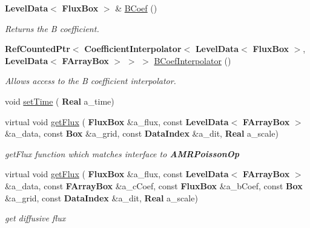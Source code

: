 \begin{DoxyCompactItemize}
\item 
\mbox{\label{class_darcy_brinkman_op_a9b2d72f39820a3dfcd502ea60232ddeb}} 
\textbf{ Level\+Data}$<$ \textbf{ Flux\+Box} $>$ \& \hyperlink{class_darcy_brinkman_op_a9b2d72f39820a3dfcd502ea60232ddeb}{B\+Coef} ()
\begin{DoxyCompactList}\small\item\em Returns the B coefficient. \end{DoxyCompactList}\item 
\mbox{\label{class_darcy_brinkman_op_a16cce095d955f2514589e45bd6b348df}} 
\textbf{ Ref\+Counted\+Ptr}$<$ \textbf{ Coefficient\+Interpolator}$<$ \textbf{ Level\+Data}$<$ \textbf{ Flux\+Box} $>$, \textbf{ Level\+Data}$<$ \textbf{ F\+Array\+Box} $>$ $>$ $>$ \hyperlink{class_darcy_brinkman_op_a16cce095d955f2514589e45bd6b348df}{B\+Coef\+Interpolator} ()
\begin{DoxyCompactList}\small\item\em Allows access to the B coefficient interpolator. \end{DoxyCompactList}\item 
void \hyperlink{class_darcy_brinkman_op_a50dc1353f78c310c788763b122ca939d}{set\+Time} (\textbf{ Real} a\+\_\+time)
\item 
virtual void \hyperlink{class_darcy_brinkman_op_adfd7590e98c5edd78140265bb05eef17}{get\+Flux} (\textbf{ Flux\+Box} \&a\+\_\+flux, const \textbf{ Level\+Data}$<$ \textbf{ F\+Array\+Box} $>$ \&a\+\_\+data, const \textbf{ Box} \&a\+\_\+grid, const \textbf{ Data\+Index} \&a\+\_\+dit, \textbf{ Real} a\+\_\+scale)
\begin{DoxyCompactList}\small\item\em get\+Flux function which matches interface to \textbf{ A\+M\+R\+Poisson\+Op} \end{DoxyCompactList}\item 
\mbox{\label{class_darcy_brinkman_op_acf0aa656f124288b7d3cd2a11b1ab0be}} 
virtual void \hyperlink{class_darcy_brinkman_op_acf0aa656f124288b7d3cd2a11b1ab0be}{get\+Flux} (\textbf{ Flux\+Box} \&a\+\_\+flux, const \textbf{ Level\+Data}$<$ \textbf{ F\+Array\+Box} $>$ \&a\+\_\+data, const \textbf{ F\+Array\+Box} \&a\+\_\+c\+Coef, const \textbf{ Flux\+Box} \&a\+\_\+b\+Coef, const \textbf{ Box} \&a\+\_\+grid, const \textbf{ Data\+Index} \&a\+\_\+dit, \textbf{ Real} a\+\_\+scale)
\begin{DoxyCompactList}\small\item\em get diffusive flux \end{DoxyCompactList}\end{DoxyCompactItemize}
